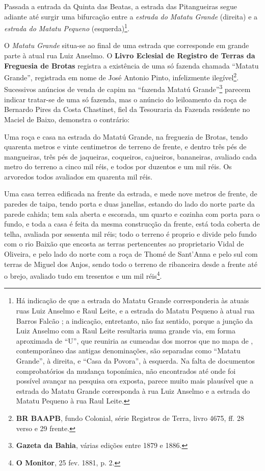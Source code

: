 Passada a entrada da Quinta das Beatas, a estrada das Pitangueiras segue adiante até surgir uma bifurcação entre a \textit{estrada do Matatu Grande} (direita) e a \textit{estrada do Matatu Pequeno} (esquerda)\footnote{Há indicação de que a estrada do Matatu Grande corresponderia às atuais ruas Luiz Anselmo e Raul Leite, e a estrada do Matatu Pequeno à atual rua Barros Falcão \cite[p.~124]{valladares_beaba_2012}; a indicação, entretanto, não faz sentido, porque a junção da Luiz Anselmo com a Raul Leite resultaria numa grande via, em forma aproximada de ``U'', que reuniria as cumeadas dos morros que no mapa de , contemporâneo das antigas denominações, são separadas como ``Matatu Grande'', à direita, e ``Casa da Povora'', à esquerda. Na falta de documentos comprobatórios da mudança toponímica, não encontrados até onde foi possível avançar na pesquisa ora exposta, parece muito mais plausível que a estrada do Matatu Grande corresponda à rua Luiz Anselmo e a estrada do Matatu Pequeno à rua Raul Leite.}.

O \textit{Matatu Grande} situa-se ao final de uma estrada que corresponde em grande parte à atual rua Luiz Anselmo. O \textbf{Livro Eclesial de Registro de Terras da Freguesia de Brotas} registra a existência de uma só fazenda chamada ``Matatu Grande'', registrada em nome de José Antonio Pinto, infelizmente ilegível\footnote{\textbf{BR BAAPB}, fundo Colonial, série Registros de Terra, livro 4675, ff. 28 verso e 29 frente.}. Sucessivos anúncios de venda de capim na ``fazenda Matatú Grande''\footnote{\textbf{Gazeta da Bahia}, várias edições entre 1879 e 1886.} parecem indicar tratar-se de uma só fazenda, mas o anúncio do leiloamento da roça de Bernardo Pires da Costa Chastinet, fiel da Tesouraria da Fazenda residente no Maciel de Baixo, demonstra o contrário:

\begin{citacao}
Uma roça e casa na estrada do Matatú Grande, na freguezia de Brotas, tendo quarenta metros e vinte centimetros de terreno de frente, e dentro três pés de mangueiras, três pés de jaqueiras, coqueiros, cajueiros, bananeiras, avaliado cada metro do terreno a cinco mil réis, e todos por duzentos e um mil réis. Os arvoredos todos avaliados em quarenta mil réis.

Uma casa terrea edificada na frente da estrada, e mede nove metros de frente, de paredes de taipa, tendo porta e duas janellas, estando do lado do norte parte da parede cahida; tem sala aberta e escorada, um quarto e cozinha com porta para o fundo, e toda a casa é feita da mesma construcção da frente, está toda coberta de telha, avaliada por sessenta mil réis; todo o terreno é proprio e divide pelo fundo com o rio Baixão que encosta as terras pertencentes ao proprietario Vidal de Oliveira, e pelo lado do norte com a roça de Thomé de Sant'Anna e pelo sul com terras de Miguel dos Anjos, sendo todo o terreno de ribanceira desde a frente até o brejo, avaliado tudo em tresentos e um mil réis\footnote{\textbf{O Monitor}, 25 fev. 1881, p. 2.}.
\end{citacao}

